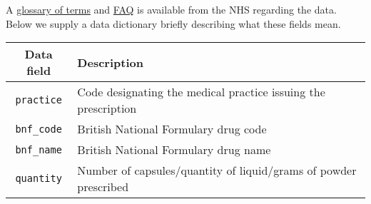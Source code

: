 \documentclass[11pt]{article}
\begin{document}
    A
\href{http://webarchive.nationalarchives.gov.uk/20180328130852tf_/http://content.digital.nhs.uk/media/10686/Download-glossary-of-terms-for-GP-prescribing---presentation-level/pdf/PLP_Presentation_Level_Glossary_April_2015.pdf/}{glossary
of terms} and
\href{http://webarchive.nationalarchives.gov.uk/20180328130852tf_/http://content.digital.nhs.uk/media/10048/FAQs-Practice-Level-Prescribingpdf/pdf/PLP_FAQs_April_2015.pdf/}{FAQ}
is available from the NHS regarding the data. Below we supply a data
dictionary briefly describing what these fields mean.

\begin{longtable}[]{@{}cl@{}}
\toprule
\begin{minipage}[b]{0.49\columnwidth}\centering
Data field\strut
\end{minipage} & \begin{minipage}[b]{0.45\columnwidth}\raggedright
Description\strut
\end{minipage}\tabularnewline
\midrule
\endhead
\begin{minipage}[t]{0.49\columnwidth}\centering
\texttt{\textquotesingle{}practice\textquotesingle{}}\strut
\end{minipage} & \begin{minipage}[t]{0.45\columnwidth}\raggedright
Code designating the medical practice issuing the prescription\strut
\end{minipage}\tabularnewline
\begin{minipage}[t]{0.49\columnwidth}\centering
\texttt{\textquotesingle{}bnf\_code\textquotesingle{}}\strut
\end{minipage} & \begin{minipage}[t]{0.45\columnwidth}\raggedright
British National Formulary drug code\strut
\end{minipage}\tabularnewline
\begin{minipage}[t]{0.49\columnwidth}\centering
\texttt{\textquotesingle{}bnf\_name\textquotesingle{}}\strut
\end{minipage} & \begin{minipage}[t]{0.45\columnwidth}\raggedright
British National Formulary drug name\strut
\end{minipage}\tabularnewline
\begin{minipage}[t]{0.49\columnwidth}\centering
\texttt{\textquotesingle{}quantity\textquotesingle{}}\strut
\end{minipage} & \begin{minipage}[t]{0.45\columnwidth}\raggedright
Number of capsules/quantity of liquid/grams of powder prescribed\strut

\end{minipage}
\end{longtable}
\end{document}
